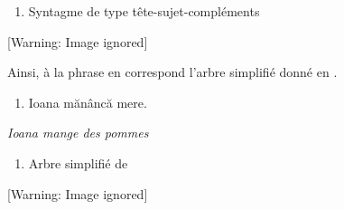 \begin{enumerate}
\item \label{bkm:Ref299382031}Syntagme de type tête-sujet-compléments


\end{enumerate}
  [Warning: Image ignored] %
 

 Ainsi, à la phrase en  correspond l'arbre simplifié donné en . 


\begin{enumerate}
\item \label{bkm:Ref299384615}Ioana mănâncă mere.


\end{enumerate}
  \textit{Ioana mange des pommes}


\begin{enumerate}
\item \label{bkm:Ref299384650}Arbre simplifié de 


\end{enumerate}
{   [Warning: Image ignored] %
} 


